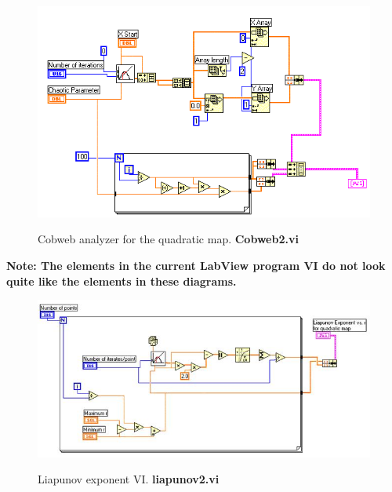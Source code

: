 \documentclass{../lab}
\begin{document}
\appendix

\begin{figure}[h]
    \centering
    \href{http://experimentationlab.berkeley.edu/sites/default/files/images/Nldimage141.gif}{\includegraphics[width=\linewidth]{images/Nldimage141.png}}
    \caption{Cobweb analyzer for the quadratic map. \textbf{Cobweb2.vi}}
\end{figure}

\textbf{Note: The elements in the current LabView program VI do not look quite like the elements in these diagrams.}

\begin{figure}[h]
    \centering
    \href{http://experimentationlab.berkeley.edu/sites/default/files/images/Nldimage142.jpg}{\includegraphics[width=\linewidth]{images/Nldimage142.jpg}}
    \caption{Liapunov exponent VI. \textbf{liapunov2.vi}}
\end{figure}
\end{document}
